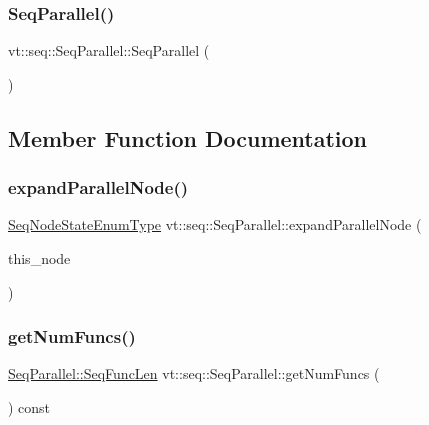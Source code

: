 \subsubsection{\texorpdfstring{Seq\+Parallel()}{SeqParallel()}\hspace{0.1cm}{\footnotesize\ttfamily [3/3]}}
{\footnotesize\ttfamily vt\+::seq\+::\+Seq\+Parallel\+::\+Seq\+Parallel (\begin{DoxyParamCaption}{ }\end{DoxyParamCaption})\hspace{0.3cm}{\ttfamily [default]}}



\subsection{Member Function Documentation}
\mbox{\label{structvt_1_1seq_1_1_seq_parallel_a76d99828f1f5ff95f3ab25765a2453c3}} 
\subsubsection{\texorpdfstring{expand\+Parallel\+Node()}{expandParallelNode()}}
{\footnotesize\ttfamily \hyperlink{namespacevt_1_1seq_ad7b0496818667d816e00f717491d3b92}{Seq\+Node\+State\+Enum\+Type} vt\+::seq\+::\+Seq\+Parallel\+::expand\+Parallel\+Node (\begin{DoxyParamCaption}\item[{\hyperlink{namespacevt_1_1seq_ae6a4874b585be0612aaca32ca6d2d191}{Seq\+Node\+Ptr\+Type}}]{this\+\_\+node }\end{DoxyParamCaption})}

\mbox{\label{structvt_1_1seq_1_1_seq_parallel_af826493cdf253e4782563bf9757f273d}} 
\subsubsection{\texorpdfstring{get\+Num\+Funcs()}{getNumFuncs()}}
{\footnotesize\ttfamily \hyperlink{structvt_1_1seq_1_1_seq_parallel_ab6a1d3fc6dbc5210e559c96f57f64e79}{Seq\+Parallel\+::\+Seq\+Func\+Len} vt\+::seq\+::\+Seq\+Parallel\+::get\+Num\+Funcs (\begin{DoxyParamCaption}{ }\end{DoxyParamCaption}) const}

